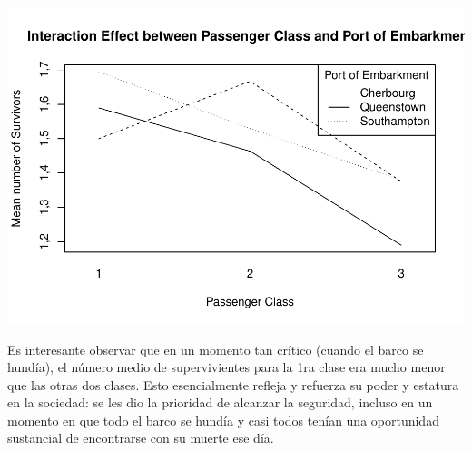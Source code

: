 \documentclass[]{article}
\newenvironment{Shaded}{\begin{snugshade}}{\end{snugshade}}
\newcommand{\KeywordTok}[1]{\textcolor[rgb]{0.13,0.29,0.53}{\textbf{#1}}}
\newcommand{\DataTypeTok}[1]{\textcolor[rgb]{0.13,0.29,0.53}{#1}}
\newcommand{\StringTok}[1]{\textcolor[rgb]{0.31,0.60,0.02}{#1}}
\newcommand{\OtherTok}[1]{\textcolor[rgb]{0.56,0.35,0.01}{#1}}
\newcommand{\OperatorTok}[1]{\textcolor[rgb]{0.81,0.36,0.00}{\textbf{#1}}}
\newcommand{\NormalTok}[1]{#1}
\begin{document}
\begin{Shaded}
\end{Shaded}

\includegraphics{titanicDataClean_files/figure-latex/unnamed-chunk-19-1.pdf}

Es interesante observar que en un momento tan crítico (cuando el barco
se hundía), el número medio de supervivientes para la 1ra clase era
mucho menor que las otras dos clases. Esto esencialmente refleja y
refuerza su poder y estatura en la sociedad: se les dio la prioridad de
alcanzar la seguridad, incluso en un momento en que todo el barco se
hundía y casi todos tenían una oportunidad sustancial de encontrarse con
su muerte ese día.
\end{document}
